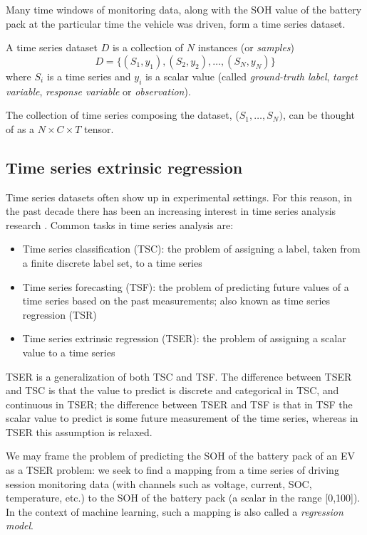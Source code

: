 Many time windows of monitoring data, along with the SOH value of the battery pack at the particular time the vehicle was driven, form a time series dataset.
\begin{definition}
\label{def:ts_ds}
A time series dataset $D$ is a collection of $N$ instances (or \textit{samples})
\[
D = \{(S_1,y_1), (S_2,y_2), \dots, (S_N,y_N)\}
\]
where $S_i$ is a time series and $y_i$ is a scalar value (called \textit{ground-truth label}, \textit{target variable}, \textit{response variable} or \textit{observation}).
\end{definition}
The collection of time series composing the dataset, ($S_1,\dots,S_N)$, can be thought of as a $N \times C \times T$ tensor.

\subsection{Time series extrinsic regression}
\label{sec:tser}
Time series datasets often show up in experimental settings. For this reason, in the past decade there has been an increasing interest in time series analysis research \cite{TSER}. Common tasks in time series analysis are:
\begin{itemize}
    \item Time series classification (TSC): the problem of assigning a label, taken from a finite discrete label set, to a time series
    \item Time series forecasting (TSF): the problem of predicting future values of a time series based on the past measurements; also known as time series regression (TSR)
    \item Time series extrinsic regression (TSER): the problem of assigning a scalar value to a time series
\end{itemize}

TSER is a generalization of both TSC and TSF. The difference between TSER and TSC is that the value to predict is discrete and categorical in TSC, and continuous in TSER; the difference between TSER and TSF is that in TSF the scalar value to predict is some future measurement of the time series, whereas in TSER this assumption is relaxed.

We may frame the problem of predicting the SOH of the battery pack of an EV as a TSER problem: we seek to find a mapping from a time series of driving session monitoring data (with channels such as voltage, current, SOC, temperature, etc.) to the SOH of the battery pack (a scalar in the range [0,100]). In the context of machine learning, such a mapping is also called a \textit{regression model}.

